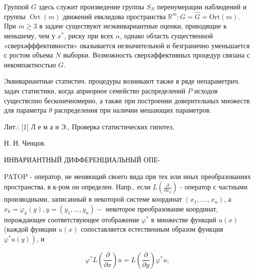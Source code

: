 \documentclass[10pt]{article}
\begin{document}
Группой $G$ здесь служит произведение группы $S_{N}$ перенумерации наблюдений и группы $\operatorname{Ort}(m)$ движений евклидова пространства $\mathbb{R}^{m} ; G=\widehat{G}=\mathrm{Ort}(m)$. При $m \geqslant 3$ в задаче существуют неэквивариантные оценки, приводящие к меньшему, чем у $x^{*}$, риску при всех $\alpha$, однако область существенной «сверхәфффективности» оказывается незначительной и безгранично уменьшается с ростом объема $N$ выборки. Возможность сверхәффективных процедур связана с некомпактностью $G$.



Эквивариантные статистич. процедуры возникают также в ряде непараметрич. задач статистики, когда априорное семейство распределений $P$ исходов существспно бесконечномерно, а также при построении доверительных множеств для параметра $\theta$ распределения при наличии мешающих параметров.



Лит.: [1] Л е м а н Э., Проверка статистических гипотез,

Н. Н. Ченцов.



ИНВАРИАНТНЫЙ ДИФФЕРЕНЦИАЛЬНЫЙ ОПЕ-



PATOP - оператор, не меняющий своего вида при тех или иных преобразованиях пространства, в к-ром он определен. Напр., если $L\left(\frac{\partial}{\partial x_{k}}\right)$ - оператор с частными производными, записанный в некоторой системе координат $\left(x_{1}, \ldots ., x_{n}\right)$, а $x_{k}=\varphi_{k}(y), y=\left(y_{1}, \ldots, y_{n}\right)-$ некоторое преобразование координат, порождающее соответствующее отображение $\varphi^{*}$ в множестве функций $u(x)$ (каждой функции $u(x)$ сопоставляется естественным образом функция $\left.\varphi^{*} u(y)\right)$, и



\[

\varphi^{*} L\left(\frac{\partial}{\partial x}\right) u=L\left(\frac{\partial}{\partial y}\right) \varphi^{*} u,

\]
\end{document}
